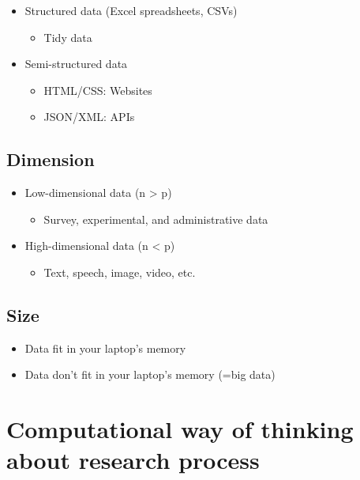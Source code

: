 \documentclass[
]{book}
\providecommand{\tightlist}{%
  \setlength{\itemsep}{0pt}\setlength{\parskip}{0pt}}
\begin{document}
\begin{itemize}
\tightlist
\item
  Structured data (Excel spreadsheets, CSVs)

  \begin{itemize}
  \tightlist
  \item
    Tidy data
  \end{itemize}
\item
  Semi-structured data

  \begin{itemize}
  \tightlist
  \item
    HTML/CSS: Websites
  \item
    JSON/XML: APIs
  \end{itemize}
\end{itemize}

\hypertarget{dimension}{%
\subsection{Dimension}\label{dimension}}

\begin{itemize}
\tightlist
\item
  Low-dimensional data (n \textgreater{} p)

  \begin{itemize}
  \tightlist
  \item
    Survey, experimental, and administrative data
  \end{itemize}
\item
  High-dimensional data (n \textless{} p)

  \begin{itemize}
  \tightlist
  \item
    Text, speech, image, video, etc.
  \end{itemize}
\end{itemize}

\hypertarget{size}{%
\subsection{Size}\label{size}}

\begin{itemize}
\tightlist
\item
  Data fit in your laptop's memory
\item
  Data don't fit in your laptop's memory (=big data)
\end{itemize}

\hypertarget{computational-way-of-thinking-about-research-process}{%
\section{Computational way of thinking about research process}\label{computational-way-of-thinking-about-research-process}}
\end{document}
